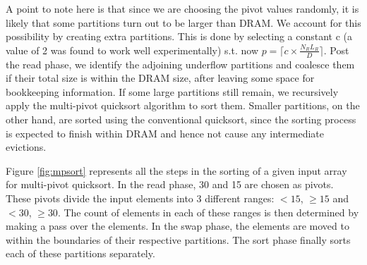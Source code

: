 A point to note here is that since we are choosing the pivot values randomly, it is likely that some partitions turn out to be larger than DRAM. We account for this possibility by creating extra partitions. This is done by selecting a constant c (a value of 2 was found to work well experimentally) s.t. now $p = \lceil c \times \frac{N_R L_R}{D} \rceil$. Post the read phase, we identify the adjoining underflow partitions and coalesce them if their total size is within the DRAM size, after leaving some space for bookkeeping information. If some large partitions still remain, we recursively apply the multi-pivot quicksort algorithm to sort them. Smaller partitions, on the other hand, are sorted using the conventional quicksort, since the sorting process is expected to finish within DRAM and hence not cause any intermediate evictions. 

Figure \ref{fig:mpsort} represents all the steps in the sorting of a given input array for multi-pivot quicksort. In the read phase, 30 and 15 are chosen as pivots. These pivots divide the input elements into 3 different ranges: $< 15$, $\geq 15$ and $< 30$, $\geq 30$. The count of elements in each of these ranges is then determined by making a pass over the elements. In the swap phase, the elements are moved to within the boundaries of their respective partitions. The sort phase finally sorts each of these partitions separately.


